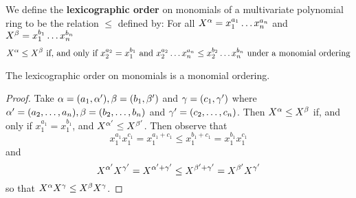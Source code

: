 \begin{definition}
  We define the \textbf{lexicographic order} on monomials of a
  multivariate polynomial ring to be the relation $\leq$ defined by:
  For all $X^\alpha=x_1^{a_1} \dots x_n^{a_n}$ and $X^\beta=x_1^{b_1} \dots
  x_n^{b_n}$
  \begin{equation*}
    X^\alpha \leq X^\beta \text{ if, and only if }
    x_2^{a_2}=x_1^{b_1} \text{ and }
    x_2^{a_2} \dots x_n^{a_n} \leq x_2^{b_2} \dots x_n^{b_n} \text{
    under a monomial ordering}
  \end{equation*}
\end{definition}

\begin{lemma}\label{lemma_7.5.3}
    The lexicographic order on monomials is a monomial ordering.
\end{lemma}
\begin{proof}
  Take $\alpha=(a_1, \alpha'), \beta= (b_1,\beta')$ and $\gamma=(c_1,\gamma')$ where
  $\alpha'=(a_2, \dots, a_n), \beta=(b_2, \dots, b_n)$ and $\gamma'=(c_2, \dots,
  c_n)$. Then $X^\alpha \leq X^\beta$ if, and only if $x_1^{a_1}=x_1^{b_1}$,
  and $X^{\alpha'} \leq X^{\beta'}$. Then observe that
  \begin{equation*}
    x_1^{a_1}x_1^{c_1}=x_1^{a_1+c_1} \leq x_1^{b_1+c_1}=x_1^{b_1}x_1^{c_1}
  \end{equation*}
  and
  \begin{equation*}
    X^{\alpha'}X^{\gamma'}=X^{\alpha'+\gamma'} \leq X^{\beta'+\gamma'}=X^{\beta'}X^{\gamma'}
  \end{equation*}
  so that $X^\alpha X^\gamma \leq X^\beta X^\gamma$.
\end{proof}
